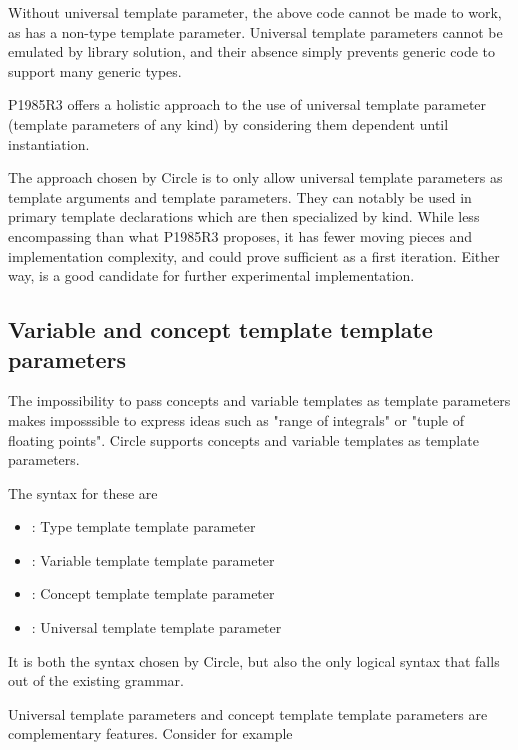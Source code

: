 \documentclass{wg21}
\begin{document}
Without universal template parameter, the above code cannot be made to work,
as  has a non-type template parameter.
Universal template parameters cannot be emulated by library solution, and their absence simply prevents
generic code to support many generic types.

P1985R3 offers a holistic approach to the use of universal template parameter (template parameters of any kind)
by considering them dependent until instantiation.

The approach chosen by Circle is to only allow universal template parameters as template arguments and template parameters. They can notably be used in primary template declarations which are then specialized by kind.
While less encompassing than what P1985R3 proposes, it has fewer moving pieces and implementation complexity, and could
prove sufficient as a first iteration.
Either way,  is a good candidate for further experimental implementation.


\subsection{Variable and concept template template parameters}
\label{sec:vartemplate}

The impossibility to pass concepts and variable templates as template parameters makes imposssible to express ideas such as "range of integrals" or "tuple of floating points".
Circle supports concepts and variable templates as template parameters.

The syntax for these are
\begin{itemize}
    \item {} : Type template template parameter
    \item {} :  Variable template template parameter
    \item {} :  Concept  template template parameter
    \item {} :  Universal template template parameter
\end{itemize}

It is both the syntax chosen by Circle, but also the only logical syntax that falls out of the existing grammar.

Universal template parameters and concept template template parameters are complementary features.
Consider for example
\end{document}
